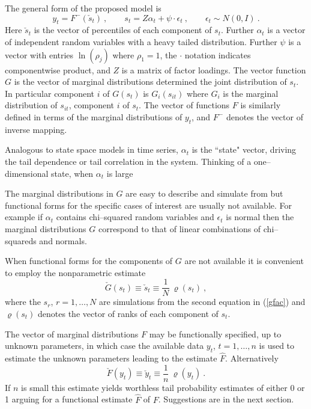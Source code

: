 \documentclass[a4paper,12pt]{article}
\newcommand{\eps}{\epsilon}
\newcommand{\ra}{\varrho}
\newcommand{\eref}[1]{(\ref{#1})}
\begin{document}
  The general form of the proposed model is
\begin{equation}\label{gfac}
   y_t=F^-(\check s_t)\ , \qquad  s_t = Z\alpha_t + \psi\cdot\eps_t\ , \qquad \eps_t\sim N(0,I)\ .
\end{equation}
Here $\check s_t$ is the vector of percentiles of each component of $s_t$.  Further $\alpha_t$ is a vector of independent random variables with a heavy tailed distribution.  Further $\psi$ is a vector with entries $\ln(\rho_j)$ where $\rho_1=1$, the $\cdot$ notation indicates componentwise product, and $Z$ is a matrix of factor loadings.  The vector function $G$ is the vector of marginal distributions determined the joint distribution of $s_t$.  In particular component $i$ of $G(s_t)$ is $G_i(s_{it})$ where $G_i$ is the marginal distribution of $s_{it}$, component $i$ of $s_t$.  The vector of functions $F$ is similarly defined in terms of the marginal distributions of $y_t$, and $F^-$ denotes the vector of inverse mapping.

Analogous to state space models in time series, $\alpha_t$ is the ``state" vector, driving the tail dependence or tail correlation in the system.  Thinking of a one--dimensional state, when $\alpha_t$ is large

The marginal distributions in $G$ are easy to describe and simulate from but functional forms for the specific cases of interest are usually not available.   For example if $\alpha_t$ contains chi--squared random variables and $\eps_t$ is normal then the marginal distributions $G$ correspond to that of linear combinations of chi--squareds and normals.

When functional forms for the components of $G$ are not available it is convenient to employ the nonparametric estimate
$$
\check G(s_t) \equiv \check s_t \equiv \frac{1}{N}\ \ra(s_t)\ ,
$$
where the $s_r$, $r=1,\ldots,N$ are simulations from the second equation in \eref{gfac} and $\ra(s_t)$ denotes the vector of ranks of each component of $s_t$.

The vector of marginal distributions $F$ may be functionally specified, up to unknown parameters,  in which case the available data $y_t$, $t=1,\ldots,n$ is used to estimate the unknown parameters  leading to the estimate $\hat F$.  Alternatively
$$
\check F(y_t) \equiv \check y_t \equiv \frac{1}{n}\ \ra(y_t)\ .
$$
If $n$ is small this estimate yields worthless tail probability estimates of either 0 or 1 arguing for a functional estimate $\hat F$ of $F$.  Suggestions are in the next section.
\end{document}
